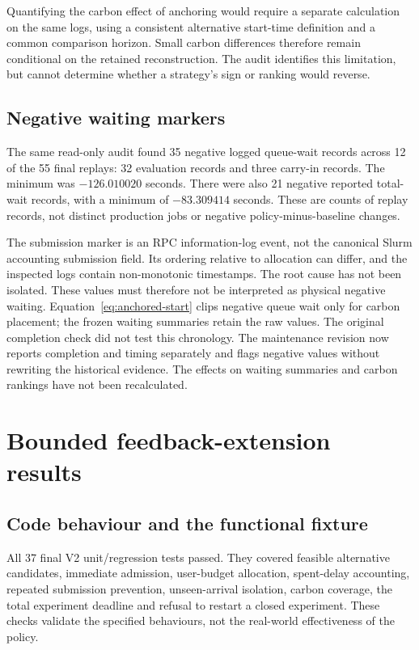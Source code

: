 Quantifying the carbon effect of anchoring would require a separate calculation on the same logs, using a consistent alternative start-time definition and a common comparison horizon. Small carbon differences therefore remain conditional on the retained reconstruction. The audit identifies this limitation, but cannot determine whether a strategy's sign or ranking would reverse.

\subsection{Negative waiting markers}\label{sec:negative-wait-audit}
The same read-only audit found 35 negative logged queue-wait records across 12 of the 55 final replays: 32 evaluation records and three carry-in records. The minimum was $-126.010020$ seconds. There were also 21 negative reported total-wait records, with a minimum of $-83.309414$ seconds. These are counts of replay records, not distinct production jobs or negative policy-minus-baseline changes.

The submission marker is an RPC information-log event, not the canonical Slurm accounting submission field. Its ordering relative to allocation can differ, and the inspected logs contain non-monotonic timestamps. The root cause has not been isolated. These values must therefore not be interpreted as physical negative waiting. Equation~\ref{eq:anchored-start} clips negative queue wait only for carbon placement; the frozen waiting summaries retain the raw values. The original completion check did not test this chronology. The maintenance revision now reports completion and timing separately and flags negative values without rewriting the historical evidence. The effects on waiting summaries and carbon rankings have not been recalculated.

\section{Bounded feedback-extension results}\label{sec:v2-results}
\subsection{Code behaviour and the functional fixture}
All 37 final V2 unit/regression tests passed. They covered feasible alternative candidates, immediate admission, user-budget allocation, spent-delay accounting, repeated submission prevention, unseen-arrival isolation, carbon coverage, the total experiment deadline and refusal to restart a closed experiment. These checks validate the specified behaviours, not the real-world effectiveness of the policy.

